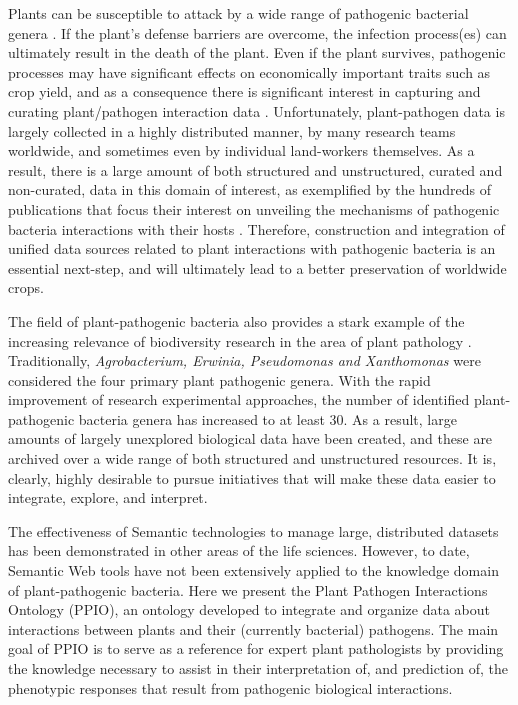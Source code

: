 \documentclass[sw]{iosart2c}
\begin{document}
Plants can be susceptible to attack by a wide range of pathogenic bacterial genera \cite{Mansfield}. If the plant's defense barriers are overcome, the infection process(es) can ultimately result in the death of the plant. Even if the plant survives, pathogenic processes may have significant effects on economically important traits such as crop yield, and as a consequence there is significant interest in capturing and curating plant/pathogen interaction data \cite{Montesinos}. Unfortunately, plant-pathogen data is largely collected in a highly distributed manner, by many research teams worldwide, and sometimes even by individual land-workers themselves.  As a result, there is a large amount of both structured and unstructured, curated and non-curated, data in this domain of interest, as exemplified by the hundreds of publications that focus their interest on unveiling the mechanisms of pathogenic bacteria interactions with their hosts \cite{DeWit,Dodds}. Therefore, construction and integration of unified data sources related to plant interactions with pathogenic bacteria is an essential next-step, and will ultimately lead to a better preservation of worldwide crops.

The field of plant-pathogenic bacteria also provides a stark example of the increasing relevance of biodiversity research in the area of plant pathology \cite{Bull2010}. Traditionally, {\itshape Agrobacterium, Erwinia, Pseudomonas and Xanthomonas} were considered the four primary plant pathogenic genera. With the rapid improvement of research experimental approaches, the number of identified plant-pathogenic bacteria genera has increased to at least 30. As a result, large amounts of largely unexplored biological data have been created, and these are archived over a wide range of both structured and unstructured resources. It is, clearly, highly desirable to pursue initiatives that will make these data easier to integrate, explore, and interpret.

The effectiveness of Semantic technologies to manage large, distributed datasets has been demonstrated in other areas of the life sciences. However, to date, Semantic Web tools have not been extensively applied to the knowledge domain of plant-pathogenic bacteria. Here we present the Plant Pathogen Interactions Ontology (PPIO), an ontology developed to integrate and organize data about interactions between plants and their (currently bacterial) pathogens. The main goal of PPIO is to serve as a reference for expert plant pathologists by providing the knowledge necessary to assist in their interpretation of, and prediction of, the phenotypic responses that result from pathogenic biological interactions.
\end{document}
